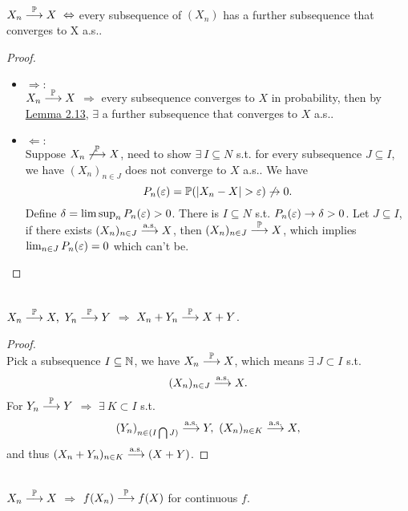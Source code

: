 \vspace{3pt}
\begin{theorem}\ \\
$X_n \overset{\mathbb{P}}{\longrightarrow} X\ \Leftrightarrow$ every subsequence of $(X_n)$ has a further subsequence that converges to X a.s..
\end{theorem}
\begin{proof}\ 
\begin{itemize}
    \item $\Rightarrow:$\\
    $X_n \overset{\mathbb{P}}{\longrightarrow} X$ $\Rightarrow$ every subsequence converges to $X$ in probability, then by \hyperref[2.13]{Lemma 2.13}, $\exists$ a further subsequence that converges to $X$ a.s..
    \item $\Leftarrow:$\\
    Suppose $X_n \not\overset{\mathbb{P}}{\longrightarrow} X$, need to show $\exists\ I \subseteq N$ s.t. for every subsequence $J \subseteq I$, we have $(X_n)_{n \in J}$ does not converge to $X$ a.s.. We have
    \begin{equation*}
        P_n(\varepsilon) = \mathbb{P}(\abs{X_n - X} > \varepsilon) \not \to 0.
    \end{equation*}
    Define $\delta = \limsup_n P_n(\varepsilon) > 0$. There is $I \subseteq N$ s.t. $P_n(\varepsilon) \to \delta > 0$. Let $J \subseteq I$, if there exists $(X_n)_{n \in J} \overset{\text{a.s.}}{\longrightarrow} X$, then $(X_n)_{n \in J} \overset{\mathbb{P}}{\longrightarrow} X$, which implies $\lim_{n \in J} P_n(\varepsilon) = 0$ which can't be. 
\end{itemize}
\end{proof}

\vspace{3pt}
\begin{corollary}\ \\
$X_n \overset{\mathbb{P}}{\longrightarrow} X,\ Y_n \overset{\mathbb{P}}{\longrightarrow} Y$ $\Rightarrow$ $X_n + Y_n \overset{\mathbb{P}}{\longrightarrow} X + Y$.
\end{corollary}
\begin{proof}\ \\
Pick a subsequence $I \subseteq \mathbb{N}$, we have $X_n \overset{\mathbb{P}}{\longrightarrow} X$, which means $\exists\ J \subset I$ s.t.
\begin{equation*}
    (X_n)_{n \in J} \overset{\text{a.s.}}{\longrightarrow} X.
\end{equation*}
For $Y_n \overset{\mathbb{P}}{\longrightarrow} Y$ $\Rightarrow$ $\exists\ K \subset I$ s.t.
\begin{equation*}
    (Y_n)_{n \in (I \cap J)} \asto Y,\ (X_n)_{n \in K} \asto X,
\end{equation*}
and thus $(X_n + Y_n)_{n \in K} \overset{\text{a.s.}}{\longrightarrow} (X + Y)$.
\end{proof}


\begin{corollary}\ \\
$X_n \overset{\mathbb{P}}{\longrightarrow} X$ $\Rightarrow$ $f(X_n) \overset{\mathbb{P}}{\longrightarrow} f(X)$ for continuous $f$.
\end{corollary}








